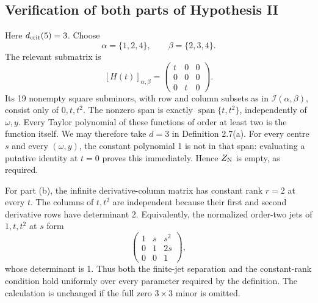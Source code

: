 \documentclass[10pt]{article}
\begin{document}
\subsection*{Verification of both parts of Hypothesis II}
Here \(d_{\rm crit}(5)=3\). Choose \[\alpha=\{1,2,4\},\qquad \beta=\{2,3,4\}.\] The relevant submatrix is \[[H(t)]_{\alpha,\beta}
 =\begin{pmatrix}t&0&0\\0&0&0\\0&t&0\end{pmatrix}.\] Its 19 nonempty square subminors, with row and column subsets as in \(\mathcal I(\alpha,\beta)\), consist only of \(0,t,t^2\). The nonzero span is exactly \(\operatorname{span}\{t,t^2\}\), independently of \(\omega,y\). Every Taylor polynomial of these functions of order at least two is the function itself. We may therefore take \(d=3\) in Definition 2.7(a). For every centre \(s\) and every \((\omega,y)\), the constant polynomial 1 is not in that span: evaluating a putative identity at \(t=0\) proves this immediately. Hence \(Z_{\rm N}\) is empty, as required.\par
For part (b), the infinite derivative-column matrix has constant rank \(r=2\) at every \(t\). The columns of \(t,t^2\) are independent because their first and second derivative rows have determinant 2. Equivalently, the normalized order-two jets of \(1,t,t^2\) at \(s\) form \[\begin{pmatrix}1&s&s^2\\0&1&2s\\0&0&1\end{pmatrix},\] whose determinant is 1. Thus both the finite-jet separation and the constant-rank condition hold uniformly over every parameter required by the definition. The calculation is unchanged if the full zero \(3\times3\) minor is omitted.\par
\end{document}

